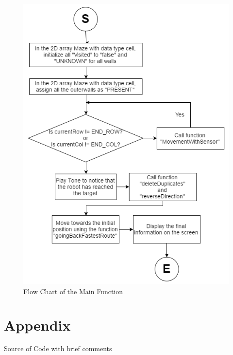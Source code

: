 \documentclass[11pt]{article}
\begin{document}
\begin{figure}[htp]
\centering
\includegraphics[scale=0.51]{images/Software_Flowchart/task_main.png}
\caption{Flow Chart of the Main Function}
\label{}
\end{figure}
\newpage









\section{Appendix}

Source of Code with brief comments
\end{document}
